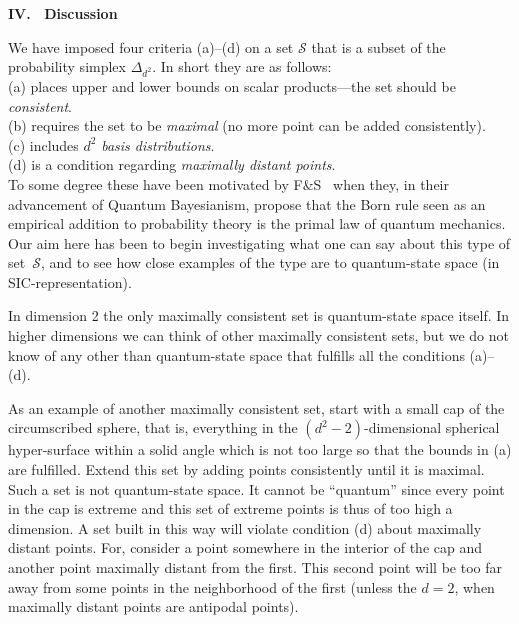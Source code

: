 \documentclass[letterpaper,11pt]{article}
\begin{document}
\begin{center}
  {\Large \bf IV. \ Discussion}
\end{center}

\noindent
We have imposed four criteria (a)--(d) on a set $\mathcal S$ that is a subset of the probability simplex $\Delta_{d^2}$. In short they are as follows:\\[4pt]
%
\hspace*{1pt} (a) places upper and lower bounds on scalar products---the set should be \emph{consistent}.\\
\hspace*{1pt} (b) requires the set to be \emph{maximal} (no more point can be added consistently).\\
\hspace*{1pt} (c) includes $d^2$ \emph{basis distributions}.\\
\hspace*{1pt} (d) is a condition regarding \emph{maximally distant points}.\\[4pt]
%
To some degree these have been motivated by F\&S~\cite{Fuchs&Schack} when they, in their advancement of Quantum Bayesianism, propose that the Born rule seen as an empirical addition to probability theory is the primal law of quantum mechanics. Our aim here has been to begin investigating what one can say about this type of set~$\mathcal S$, and to see how close examples of the type are to quantum-state space (in SIC-representation).

In dimension 2 the only maximally consistent set is quantum-state space itself. In higher dimensions we can think of other maximally consistent sets, but we do not know of any other than quantum-state space that fulfills all the conditions (a)--(d).

As an example of another maximally consistent set, start with a small cap of the circumscribed sphere, that is, everything in the $(d^2-2)$-dimensional spherical hyper-surface within a solid angle which is not too large so that the bounds in (a) are fulfilled. Extend this set by adding points consistently until it is maximal. Such a set is not quantum-state space. It cannot be ``quantum'' since every point in the cap is extreme and this set of extreme points is thus of too high a dimension. A set built in this way will violate condition (d) about maximally distant points. For, consider a point somewhere in the interior of the cap and another point maximally distant from the first. This second point will be too far away from some points in the neighborhood of the first (unless the $d=2$, when maximally distant points are antipodal points).
\end{document}
